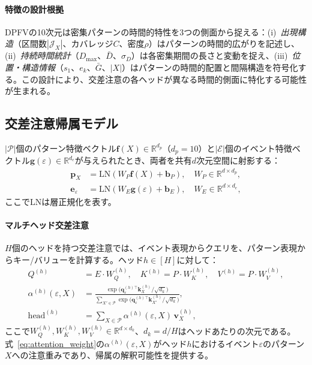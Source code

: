 \documentclass[sigconf,nonacm]{acmart}
\begin{document}
\paragraph{特徴の設計根拠}
DPFVの10次元は密集パターンの時間的特性を3つの側面から捉える：(i)~\emph{出現構造}（区間数$|\mathcal{J}_X|$、カバレッジ$C$、密度$\rho$）はパターンの時間的広がりを記述し、(ii)~\emph{持続時間統計}（$D_{\max}$、$\bar{D}$、$\sigma_D$）は各密集期間の長さと変動を捉え、(iii)~\emph{位置・構造情報}（$s_1$、$e_k$、$\bar{G}$、$|X|$）はパターンの時間的配置と間隔構造を符号化する。この設計により、交差注意の各ヘッドが異なる時間的側面に特化する可能性が生まれる。

\subsection{交差注意帰属モデル}

$|\mathcal{P}|$個のパターン特徴ベクトル$\mathbf{f}(X) \in \mathbb{R}^{d_p}$（$d_p = 10$）と$|\mathcal{E}|$個のイベント特徴ベクトル$\mathbf{g}(\varepsilon) \in \mathbb{R}^{d_e}$が与えられたとき、両者を共有$d$次元空間に射影する：
\begin{align}
    \mathbf{p}_X &= \text{LN}(W_P \mathbf{f}(X) + \mathbf{b}_P), \quad W_P \in \mathbb{R}^{d \times d_p}, \\
    \mathbf{e}_\varepsilon &= \text{LN}(W_E \mathbf{g}(\varepsilon) + \mathbf{b}_E), \quad W_E \in \mathbb{R}^{d \times d_e},
\end{align}
ここで$\text{LN}$は層正規化を表す。

\paragraph{マルチヘッド交差注意}
$H$個のヘッドを持つ交差注意では、イベント表現からクエリを、パターン表現からキー/バリューを計算する。ヘッド$h \in [H]$に対して：
\begin{align}
    Q^{(h)} &= E \cdot W_Q^{(h)}, \quad K^{(h)} = P \cdot W_K^{(h)}, \quad V^{(h)} = P \cdot W_V^{(h)}, \\
    \alpha^{(h)}(\varepsilon, X) &= \frac{\exp\!\bigl(\mathbf{q}_\varepsilon^{(h)\top} \mathbf{k}_X^{(h)} / \sqrt{d_k}\bigr)}{\sum_{X' \in \mathcal{P}} \exp\!\bigl(\mathbf{q}_\varepsilon^{(h)\top} \mathbf{k}_{X'}^{(h)} / \sqrt{d_k}\bigr)}, \label{eq:attention_weight}\\
    \text{head}^{(h)} &= \sum_{X \in \mathcal{P}} \alpha^{(h)}(\varepsilon, X) \, \mathbf{v}_X^{(h)},
\end{align}
ここで$W_Q^{(h)}, W_K^{(h)}, W_V^{(h)} \in \mathbb{R}^{d \times d_k}$、$d_k = d / H$はヘッドあたりの次元である。式~\eqref{eq:attention_weight}の$\alpha^{(h)}(\varepsilon, X)$がヘッド$h$におけるイベント$\varepsilon$のパターン$X$への注意重みであり、帰属の解釈可能性を提供する。
\end{document}
